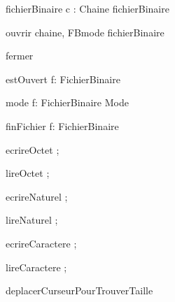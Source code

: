  \begin{algorithme}

\signaturefonction 
{fichierBinaire}
{c : Chaine}
{fichierBinaire}

\signaturefonction
{ouvrir}
{chaine, FBmode}
{fichierBinaire}

\signatureprocedure
{fermer}
{}

\signaturefonction
{estOuvert}
{f: FichierBinaire}
{\booleen}

\signaturefonction
{mode}
{f: FichierBinaire}
{Mode}

\signaturefonction
{finFichier}
{f: FichierBinaire}
{\booleen}

\signatureprocedure
{ecrireOctet}
{ ; }

\signatureprocedure
{lireOctet}
{ ; }

\signatureprocedure
{ecrireNaturel}
{ ; }

\signatureprocedure
{lireNaturel}
{ ; }

\signatureprocedure
{ecrireCaractere}
{ ; }

\signatureprocedure
{lireCaractere}
{ ; }

\signatureprocedure
{deplacerCurseurPourTrouverTaille}
{}

\end{algorithme}

